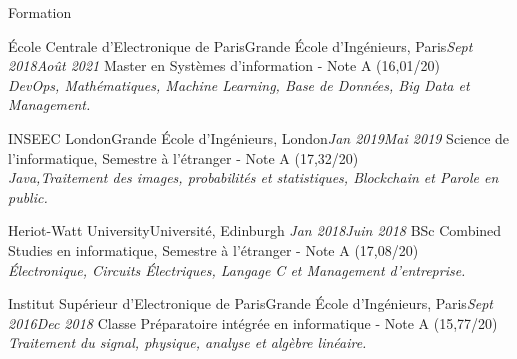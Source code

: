 \documentclass{resume}
\begin{document}
	\begin{rSection}{Formation}
		\begin{school}{École Centrale d'Electronique de Paris}{Grande École d'Ingénieurs, Paris}{\em Sept 2018}{\em Août 2021}{
			Master en Systèmes d'information  - Note A (16,01/20)  \\ 
			\textit{\small{DevOps, Mathématiques, Machine Learning, Base de Données, Big Data et Management.}}
		}
		\end{school}

		\begin{school}{INSEEC London}{Grande École d'Ingénieurs, London}{\em Jan 2019}{\em Mai 2019}{
			Science de l'informatique, Semestre à l'étranger - Note A (17,32/20)  \\
			\textit{\small{Java,Traitement des images, probabilités et statistiques, Blockchain et Parole en public.}}		
		}
		\end{school}
		
		\begin{school}{Heriot-Watt University}{Université, Edinburgh }{\em Jan 2018}{\em Juin 2018}{
			BSc Combined Studies en informatique,  Semestre à l'étranger - Note A (17,08/20) \\
			\textit{\small{Électronique, Circuits Électriques, Langage C et Management d'entreprise.}}
		}	
		\end{school}

		\begin{school}{Institut Supérieur d'Electronique de Paris}{Grande École d'Ingénieurs, Paris}{\em Sept 2016}{\em Dec 2018}{
			Classe Préparatoire intégrée en informatique - Note A (15,77/20)\\
			\textit{\small{Traitement du signal, physique, analyse et algèbre linéaire.}}
		}
		\end{school}
	\end{rSection}
\end{document}
